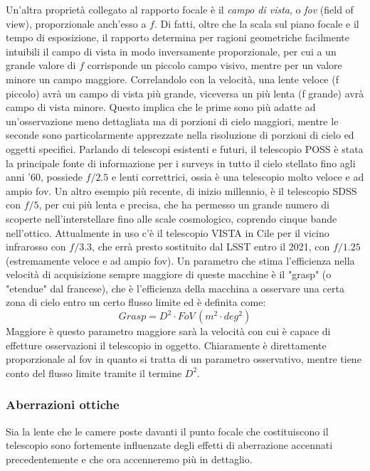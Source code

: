 \documentclass[a4paper,twoside,openany,notitlepage]{book}
\theoremstyle{definition}
\theoremstyle{plain}
\begin{document}
Un'altra proprietà collegato al rapporto focale è il \textit{campo di vista}, o \textit{fov} (field of view), proporzionale anch'esso a $f$. Di fatti, oltre che la scala sul piano focale e il tempo di esposizione, il rapporto determina per ragioni geometriche facilmente intuibili il campo di vista in modo inversamente proporzionale, per cui a un grande valore di $f$ corrisponde un piccolo campo visivo, mentre per un valore minore un campo maggiore. Correlandolo con la velocità, una lente veloce (f piccolo) avrà un campo di vista più grande, viceversa un più lenta (f grande) avrà campo di vista minore. Questo implica che le prime sono più adatte ad un'osservazione meno dettagliata ma di porzioni di cielo maggiori, mentre le seconde sono particolarmente apprezzate nella risoluzione di porzioni di cielo ed oggetti specifici. Parlando di telescopi esistenti e futuri, il telescopio POSS è stata la principale fonte di informazione per i surveys in tutto il cielo stellato fino agli anni '60, possiede $f/2.5$ e lenti correttrici, ossia è una telescopio molto veloce e ad ampio fov. Un altro esempio più recente, di inizio millennio, è il telescopio SDSS con $f/5$, per cui più lenta e precisa, che ha permesso un grande numero di scoperte nell'interstellare fino alle scale cosmologico, coprendo cinque bande nell'ottico. Attualmente in uso c'è il telescopio VISTA in Cile per il vicino infrarosso con $f/3.3$, che errà presto sostituito dal LSST entro il 2021, con $f/1.25$ (estremamente veloce e ad ampio fov). Un parametro che stima l'efficienza nella velocità di acquisizione sempre maggiore di queste macchine è il "grasp" (o "etendue" dal francese), che è l'efficienza della macchina a osservare una certa zona di cielo entro un certo flusso limite ed è definita come:
\begin{equation*}
	Grasp = D^2 \cdot FoV \, (m^2 \cdot deg^2)
\end{equation*}
Maggiore è questo parametro maggiore sarà la velocità con cui è capace di effetture osservazioni il telescopio in oggetto. Chiaramente è direttamente proporzionale al fov in quanto si tratta di un parametro osservativo, mentre tiene conto del flusso limite tramite il termine $D^2$.

\subsubsection*{Aberrazioni ottiche}

Sia la lente che le camere poste davanti il punto focale che costituiscono il telescopio sono fortemente influenzate degli effetti di aberrazione accennati precedentemente e che ora accenneremo più in dettaglio.
\end{document}
